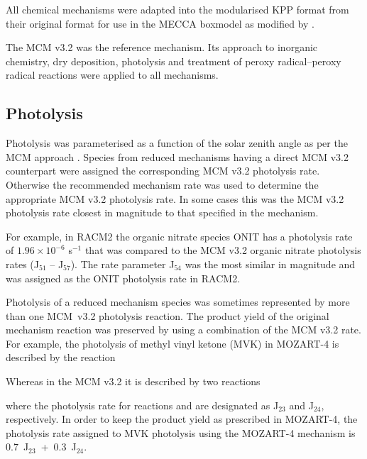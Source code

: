 All chemical mechanisms were adapted into the modularised KPP \citep{Damian:2002} format from their original format for use in the MECCA boxmodel \citep{Sander:2005} as modified by \citep{Butler:2011}.

The MCM v3.2 \citep{Jenkin:1997, Jenkin:2003, Saunders:2003, Bloss:2005, MCM_Site} was the reference mechanism. 
Its approach to inorganic chemistry, dry deposition, photolysis and treatment of peroxy radical--peroxy radical reactions were applied to all mechanisms. 

\subsection{Photolysis} \label{ss:photolysis}
Photolysis was parameterised as a function of the solar zenith angle as per the MCM approach \citep{Saunders:2003}. 
Species from reduced mechanisms having a direct MCM v3.2 counterpart were assigned the corresponding MCM v3.2 photolysis rate. 
Otherwise the recommended mechanism rate was used to determine the appropriate MCM v3.2 photolysis rate. 
In some cases this was the MCM v3.2 photolysis rate closest in magnitude to that specified in the mechanism. 

For example, in RACM2 the organic nitrate species ONIT has a photolysis rate of $1.96 \times 10^{-6}$ s$^{-1}$ that was compared to the MCM v3.2 organic nitrate photolysis rates (J$_{51}$ -- J$_{57}$). 
The rate parameter J$_{54}$ was the most similar in magnitude and was assigned as the ONIT photolysis rate in RACM2.

Photolysis of a reduced mechanism species was sometimes represented by more than one \mbox{MCM v3.2} photolysis reaction. 
The product yield of the original mechanism reaction was preserved by using a combination of the MCM v3.2 rate. 
For example, the photolysis of methyl vinyl ketone (MVK) in MOZART-4 is described by the reaction
\begin{reactionlist}
\end{reactionlist} 
Whereas in the MCM v3.2 it is described by two reactions
\begin{reactionlist}
\end{reactionlist}
where the photolysis rate for reactions  and  are designated as J$_{23}$ and J$_{24}$,
respectively. 
In order to keep the product yield as prescribed in MOZART-4, the photolysis rate assigned to MVK photolysis using the MOZART-4 mechanism is \mbox{$0.7$ J$_{23}$ + $0.3$ J$_{24}$}.



